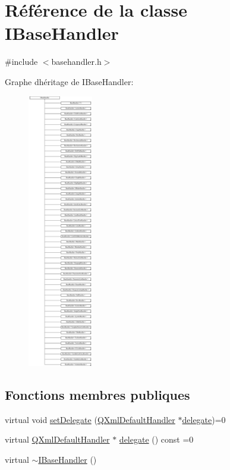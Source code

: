 \hypertarget{class_i_base_handler}{}\section{Référence de la classe I\+Base\+Handler}
\label{class_i_base_handler}


{\ttfamily \#include $<$basehandler.\+h$>$}

Graphe d\textquotesingle{}héritage de I\+Base\+Handler\+:\begin{figure}[H]
\begin{center}
\leavevmode
\includegraphics[height=12.000000cm]{class_i_base_handler}
\end{center}
\end{figure}
\subsection*{Fonctions membres publiques}
\begin{DoxyCompactItemize}
\item 
virtual void \hyperlink{class_i_base_handler_ad26c98fb9119383d980b09375ffed9ea}{set\+Delegate} (\hyperlink{class_q_xml_default_handler}{Q\+Xml\+Default\+Handler} $\ast$\hyperlink{class_i_base_handler_abe519f4796cc0592b4e83eacccb2bcd1}{delegate})=0
\item 
virtual \hyperlink{class_q_xml_default_handler}{Q\+Xml\+Default\+Handler} $\ast$ \hyperlink{class_i_base_handler_abe519f4796cc0592b4e83eacccb2bcd1}{delegate} () const  =0
\item 
virtual \hyperlink{class_i_base_handler_af8cb238f7f1a7d84e8790e6ec8b513bb}{$\sim$\+I\+Base\+Handler} ()
\end{DoxyCompactItemize}


